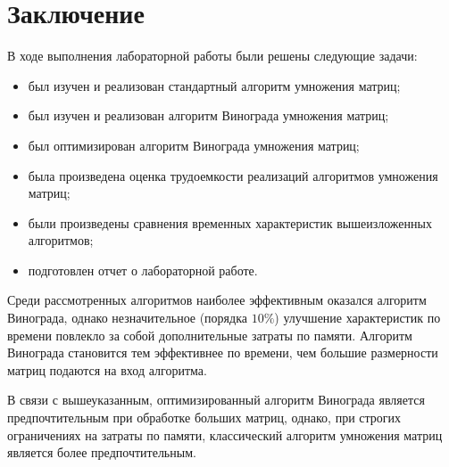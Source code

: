 \chapter*{Заключение}

В ходе выполнения лабораторной работы были решены следующие задачи:
\begin{itemize}
	\item был изучен и реализован стандартный алгоритм умножения матриц;
	\item был изучен и реализован алгоритм Винограда умножения матриц;
	\item был оптимизирован алгоритм Винограда умножения матриц;
	\item была произведена оценка трудоемкости реализаций алгоритмов умножения матриц;
	\item были произведены сравнения временных характеристик вышеизложенных алгоритмов;
	\item подготовлен отчет о лабораторной работе.
\end{itemize}
 
Среди рассмотренных алгоритмов наиболее эффективным оказался алгоритм Винограда, однако незначительное (порядка $ 10\% $) улучшение характеристик по времени повлекло за собой дополнительные затраты по памяти.
Алгоритм Винограда становится тем эффективнее по времени, чем большие размерности матриц подаются на вход алгоритма.

В связи с вышеуказанным, оптимизированный алгоритм Винограда является предпочтительным при обработке больших матриц, однако, при строгих ограничениях на затраты по памяти, классический алгоритм умножения матриц является более предпочтительным.